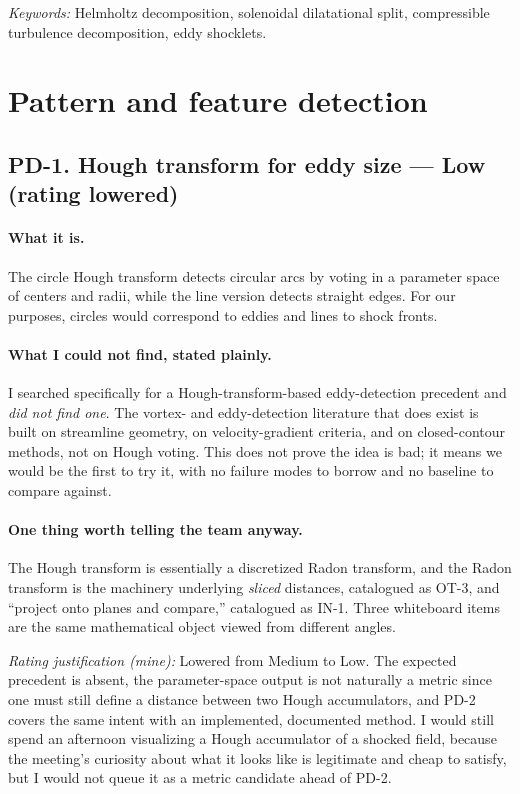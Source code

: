 \documentclass[11pt]{article}
\newcommand{\Low}{\textbf{Low}}
\newcommand{\keywords}[1]{\par\smallskip\noindent\textit{Keywords:} #1}
\newcommand{\rating}[1]{\par\smallskip\noindent\textit{Rating justification (mine):} #1}
\begin{document}
\keywords{Helmholtz decomposition, solenoidal dilatational split, compressible turbulence
decomposition, eddy shocklets.}

\section{Pattern and feature detection}

\subsection{PD-1. Hough transform for eddy size --- \Low{} (rating lowered)}
\label{sec:hough}

\paragraph{What it is.} The circle Hough transform detects circular arcs by voting in a
parameter space of centers and radii, while the line version detects straight edges. For our
purposes, circles would correspond to eddies and lines to shock fronts.

\paragraph{What I could not find, stated plainly.} I searched specifically for a
Hough-transform-based eddy-detection precedent and \emph{did not find one}. The vortex- and
eddy-detection literature that does exist is built on streamline geometry, on
velocity-gradient criteria, and on closed-contour methods, not on Hough voting. This does
not prove the idea is bad; it means we would be the first to try it, with no failure modes
to borrow and no baseline to compare against.

\paragraph{One thing worth telling the team anyway.} The Hough transform is essentially a
discretized Radon transform, and the Radon transform is the machinery underlying
\emph{sliced} distances, catalogued as OT-3, and ``project onto planes and compare,''
catalogued as IN-1. Three whiteboard items are the same mathematical object viewed from
different angles.

\rating{Lowered from Medium to Low. The expected precedent is absent, the parameter-space
output is not naturally a metric since one must still define a distance between two Hough
accumulators, and PD-2 covers the same intent with an implemented, documented method. I
would still spend an afternoon visualizing a Hough accumulator of a shocked field, because
the meeting's curiosity about what it looks like is legitimate and cheap to satisfy, but I
would not queue it as a metric candidate ahead of PD-2.}
\end{document}
